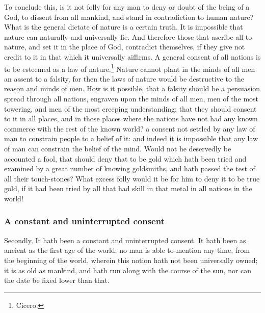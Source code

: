 \documentclass[a5paper]{book}
\begin{document}
To conclude this, 
    is it not folly for any man to deny or doubt of the being of a God, 
    to dissent from all mankind, and stand in contradiction to human nature? 
What is the general dictate of nature is a certain truth. 
It is impossible that nature can naturally and universally lie. 
And therefore those that ascribe all to nature, 
    and set it in the place of God, contradict themselves, 
    if they give not credit to it in that which it universally aiffirms. 
A general consent of all nations is to be esteemed as a law of nature.\footnote{Cicero.} 
Nature cannot plant in the minds of all men an assent to a falsity, 
    for then the laws of nature would be destructive to the reason and minds of men.
How is it possible, that a falsity should be a persuasion spread
    through all nations, 
    engraven upon the minds of all men, 
    men of the most towering, 
    and men of the most creeping understanding; 
    that they should consent to it in all places, 
    and in those places where the nations have not had any known commerce 
    with the rest of the known world? 
    a consent not settled by any law of man to constrain people to a belief of it: 
    and indeed it is impossible that any law of man can constrain 
    the belief of the mind. 
Would not he deservedly be accounted a fool, 
    that should deny that to be gold which hath been tried and examined 
    by a great number of knowing goldsmiths,
    and hath passed the test of all their touch-stones?
What excess folly would it be for him to deny it to be true gold, 
    if it had been tried by all that had skill in that metal 
    in all nations in the world!
\subsubsection{A constant and uninterrupted consent}
Secondly, It hath been a constant and uninterrupted consent. 
It hath been as ancient as the first age of the world; 
    no man is able to mention any time, 
    from the beginning of the world, 
    wherein this notion hath not been universally owned; 
    it is as old as mankind,
    and hath run along with the course of the sun, 
    nor can the date be fixed lower than that.
\end{document}
